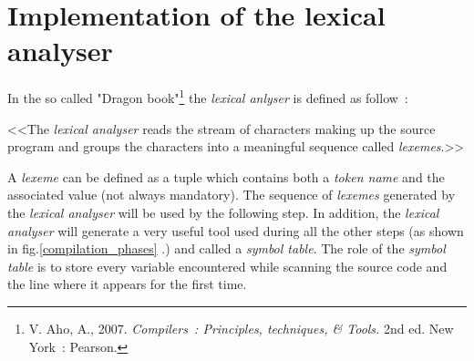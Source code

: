 \documentclass[a4paper,11pt]{article}
\begin{document}
\section{Implementation of the lexical analyser}
  In the so called "Dragon book"\footnote{V. Aho, A., 2007. \textit{Compilers~: Principles, techniques, \& Tools.} 2nd ed. New York~: Pearson.} the \textit{lexical anlyser} is defined as follow~:
  \begin{center}
    <<The \textit{lexical analyser} reads the stream of characters making up the source program and groups the characters into a meaningful sequence called \textit{lexemes}.>>
  \end{center}
  A \textit{lexeme} can be defined as a tuple which contains both a \textit{token name} and the associated value (not always mandatory). The sequence of \textit{lexemes} generated by the \textit{lexical analyser} will be used by the following step. In addition, the \textit{lexical analyser} will generate a very useful tool used during all the other steps (as shown in fig.\ref{compilation_phases} .) and called a \textit{symbol table}. The role of the \textit{symbol table} is to store every variable encountered while scanning the source code and the line where it appears for the first time.\\
  
\end{document}
